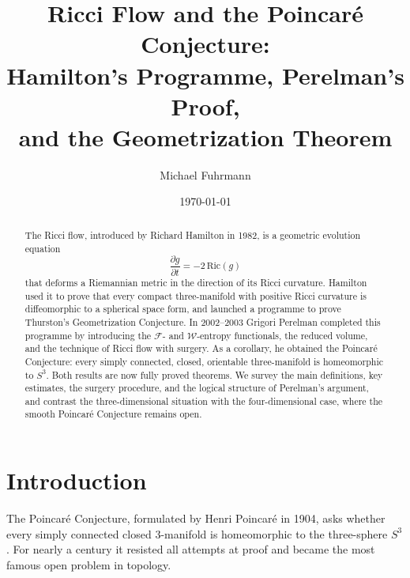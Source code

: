 \documentclass[12pt,a4paper]{amsart}
\theoremstyle{definition}
\theoremstyle{remark}
\newcommand{\Ric}{\mathrm{Ric}}
\begin{document}

\title{Ricci Flow and the Poincar\'{e} Conjecture:\\
       Hamilton's Programme, Perelman's Proof,\\
       and the Geometrization Theorem}

\author{Michael Fuhrmann}
\address{Specialist Mathematics Project, Build 147}
\date{\today}

\begin{abstract}
The Ricci flow, introduced by Richard Hamilton in 1982, is a geometric
evolution equation
\[
  \frac{\partial g}{\partial t} = -2\,\Ric(g)
\]
that deforms a Riemannian metric in the direction of its Ricci curvature.
Hamilton used it to prove that every compact three-manifold with positive
Ricci curvature is diffeomorphic to a spherical space form, and launched a
programme to prove Thurston's Geometrization Conjecture.  In 2002--2003
Grigori Perelman completed this programme by introducing the $\mathcal{F}$-
and $\mathcal{W}$-entropy functionals, the reduced volume, and the technique
of Ricci flow with surgery.  As a corollary, he obtained the Poincar\'{e}
Conjecture: every simply connected, closed, orientable three-manifold is
homeomorphic to $S^3$.  Both results are now fully proved theorems.  We
survey the main definitions, key estimates, the surgery procedure, and the
logical structure of Perelman's argument, and contrast the three-dimensional
situation with the four-dimensional case, where the smooth Poincar\'{e}
Conjecture remains open.
\end{abstract}

\maketitle
\tableofcontents

\section{Introduction}

The Poincar\'{e} Conjecture, formulated by Henri Poincar\'{e} in 1904, asks
whether every simply connected closed $3$-manifold is homeomorphic to the
three-sphere $S^3$.  For nearly a century it resisted all attempts at proof
and became the most famous open problem in topology.
\end{document}
